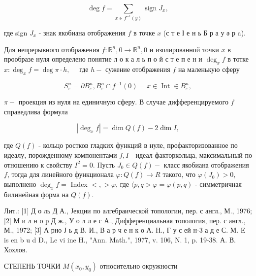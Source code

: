 \documentclass[10pt]{article}
\begin{document}
\[

\operatorname{deg} f=\sum_{x \in f^{-1}(y)} \operatorname{sign} J_{x},

\]



где sign $J_{x}$ - знак якобиана отображения $f$ в точке $x$ (с т е І е н ь Б р а у ә р a).



Для непрерывного отображения $f: \mathbb{R}^{n}, 0 \rightarrow \mathbb{R}^{n}, 0$ и изолированной точки $x$ в прообразе нуля определено понятие л о к а л ь п о й с т е п е н и $\operatorname{deg}_{x} f$ в тотке $x: \operatorname{deg}_{x} f=\operatorname{deg} \pi \cdot h, \quad$ где $h-$ сужение отображения $f$ на маленькую сферу



\[

S_{\varepsilon}^{n}=\partial B_{\varepsilon}^{n}, B_{\varepsilon}^{n} \cap f^{-1}(0)=x \in \operatorname{Int} \in B_{\varepsilon}^{n},

\]



$\pi-$ проекция из нуля на единичную сферу. В случае дифференцируемого $f$ справедлива формула



\[

\left|\operatorname{deg}_{x} f\right|=\operatorname{dim} Q(f)-2 \operatorname{dim} I,

\]



где $Q(f)$ - кольцо ростков гладких функций в нуле, профакторизованное по идеалу, порожденному компонентами $f, I$ - идеал факторкольца, максимальный по отношению к свойству $I^{2}=0$. Пусть $J_{0} \in Q(f)-$ класс якобиана отображения $f$, тогда для линейного функционала $\varphi: Q(f) \rightarrow R$ такого, что $\varphi\left(J_{0}\right)>0$, выполнено $\operatorname{deg}_{x} f=$ Index $<,>\varphi$, где $\langle p, q>\varphi=\varphi(p, q)$ - симметричная билинейная форма на $Q(f)$.



Лит.: [1] Д о ль Д А., Јекции по алгебраической топологии, пер. с англ., М., 1976; [2] М и л н о р Д ж., У о л л е с А., Дифференциальная топология, пер. с англ., М., 1972; [3] А рно Ј ь д В. И., В а р ч е н к о А. Н., Г у с ей н-3 а д е С. М. E is en b u d D., Le vi ine H., "Ann. Math.", 1977, v. 106, N. 1, p. 19-38. А. В. Хохлов.



СТЕПЕНЬ ТОЧКИ $M\left(x_{0}, y_{0}\right)$ относительно окружности
\end{document}
